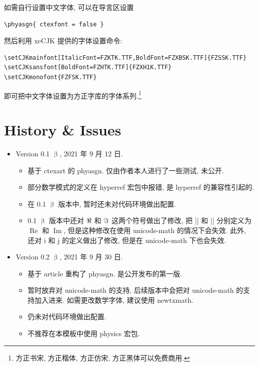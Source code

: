 \documentclass{phyasgn}\usepackage{nag}
\newcommand\pkg[1]{\textsf{#1}}
\def\phyasgn{\pkg{phyasgn}}
\begin{document}
如需自行设置中文字体, 可以在导言区设置
\begin{Verbatim}
\phyasgn{ ctexfont = false }
\end{Verbatim}
然后利用 \pkg{xeCJK} 提供的字体设置命令:
\begin{Verbatim}
\setCJKmainfont[ItalicFont=FZKTK.TTF,BoldFont=FZXBSK.TTF]{FZSSK.TTF}
\setCJKsansfont[BoldFont=FZHTK.TTF]{FZXH1K.TTF}
\setCJKmonofont{FZFSK.TTF}
\end{Verbatim}
即可把中文字体设置为方正字库的字体系列.\footnote{{\FZSS 方正书宋}, 
{\FZKT 方正楷体}, {\FZFS 方正仿宋}, {\FZHT 方正黑体}可以免费商用.}


\section{History \& Issues}
\begin{itemize}
\item Version 0.1 $\upbeta$, 2021 年 9 月 12 日. 
\begin{itemize}
\item 基于 \textsf{ctexart} 的 \phyasgn. 仅由作者本人进行了一些测试, 未公开.
\item 部分数学模式的定义在 \pkg{hyperref} 宏包中报错, 是 \pkg{hyperref} 的兼容性引起的.
\item 在 0.1 $\upbeta$ 版本中, 暂时还未对代码环境做出配置.
\item 0.1 $\upbeta$ 版本中还对 $\Re$ 和 $\Im$ 这两个符号做出了修改, 把 |\Re| 和 |\Im| 
分别定义为 $\operatorname{Re}$ 和 $\operatorname{Im}$, 但是这种修改在使用 \pkg{unicode-math} 
的情况下会失效. 此外, 还对 $\mathrm{i}$ 和 $\mathrm{j}$ 的定义做出了修改, 但是在 \pkg{unicode-math} 
下也会失效.
\end{itemize}
\item Version 0.2 $\upbeta$, 2021 年 9 月 30 日. 
\begin{itemize}
\item 基于 \textsf{article} 重构了 \phyasgn. 是公开发布的第一版.
\item 暂时放弃对 \pkg{unicode-math} 的支持, 后续版本中会把对 \pkg{unicode-math} 的支持加入进来. 
如需更改数学字体, 建议使用 \pkg{newtxmath}.
\item 仍未对代码环境做出配置.
\item 不推荐在本模板中使用 \pkg{physics} 宏包.
\end{itemize}

\end{itemize}
\end{document}
